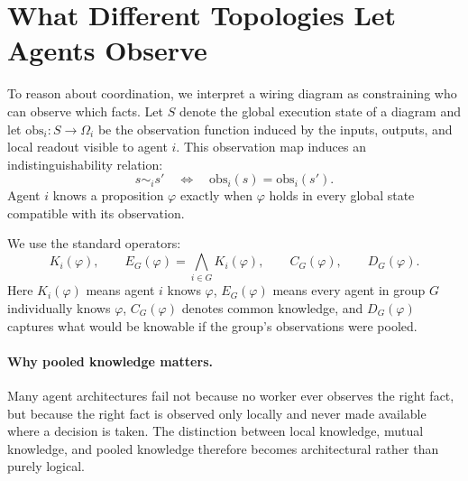\section{What Different Topologies Let Agents Observe}

To reason about coordination, we interpret a wiring diagram as constraining who can observe which facts.
Let $S$ denote the global execution state of a diagram and let $\mathrm{obs}_i : S \to \Omega_i$ be the
observation function induced by the inputs, outputs, and local readout visible to agent $i$. This
observation map induces an indistinguishability relation:
\[
s \sim_i s' \quad \Longleftrightarrow \quad \mathrm{obs}_i(s) = \mathrm{obs}_i(s').
\]
Agent $i$ knows a proposition $\varphi$ exactly when $\varphi$ holds in every global state compatible with
its observation.

We use the standard operators:
\[
K_i(\varphi), \qquad
E_G(\varphi) = \bigwedge_{i \in G} K_i(\varphi), \qquad
C_G(\varphi), \qquad
D_G(\varphi).
\]
Here $K_i(\varphi)$ means agent $i$ knows $\varphi$, $E_G(\varphi)$ means every agent in group $G$
individually knows $\varphi$, $C_G(\varphi)$ denotes common knowledge, and $D_G(\varphi)$ captures what
would be knowable if the group's observations were pooled.

\paragraph{Why pooled knowledge matters.}
Many agent architectures fail not because no worker ever observes the right fact, but because the right
fact is observed only locally and never made available where a decision is taken. The distinction between
local knowledge, mutual knowledge, and pooled knowledge therefore becomes architectural rather than purely
logical.

